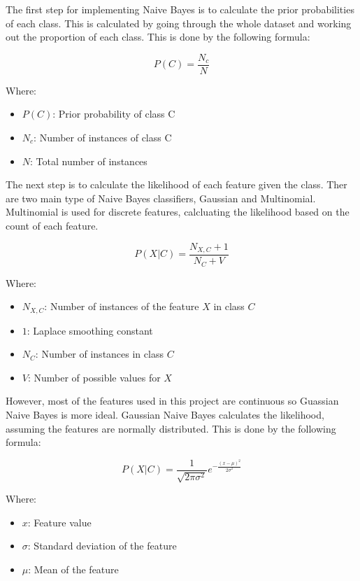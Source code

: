 The first step for implementing Naive Bayes is to calculate the prior probabilities of each class. This is calculated by going through the whole dataset and working out the proportion of each class. This is done by the following formula:

\begin{equation}
    \label{eq:prior}
    P(C) = \frac{N_c}{N}
\end{equation}

Where:
\begin{itemize}
    \item $P(C)$: Prior probability of class C
    \item $N_c$: Number of instances of class C
    \item $N$: Total number of instances
\end{itemize}

The next step is to calculate the likelihood of each feature given the class. Ther are two main type of Naive Bayes classifiers, Gaussian and Multinomial. Multinomial is used for discrete features, calcluating the likelihood based on the count of each feature. 

\begin{equation}
    \label{eq:multinomial}
    P(X | C) = \frac{N_{X,C} + 1}{N_C + V}
\end{equation}

Where:
\begin{itemize}
    \item $N_{X,C}$: Number of instances of the feature $X$ in class $C$
    \item $1$: Laplace smoothing constant
    \item $N_C$: Number of instances in class $C$
    \item $V$: Number of possible values for $X$
\end{itemize}

However, most of the features used in this project are continuous so Guassian Naive Bayes is more ideal. Gaussian Naive Bayes calculates the likelihood, assuming the features are normally distributed. This is done by the following formula:

\begin{equation}
    \label{eq:gaussian}
    P(X | C) = \frac{1}{\sqrt{2\pi\sigma^2}} e^{-\frac{(x - \mu)^2}{2\sigma^2}}
\end{equation}

Where:
\begin{itemize}
    \item $x$: Feature value
    \item $\sigma$: Standard deviation of the feature
    \item $\mu$: Mean of the feature
\end{itemize}

